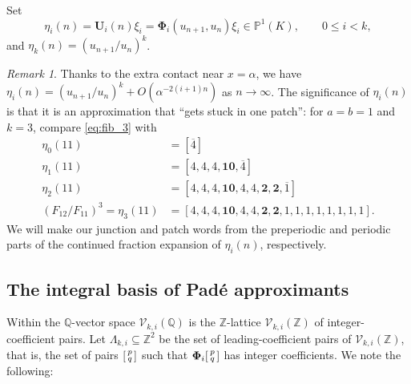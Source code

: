\documentclass{article}
\numberwithin{equation}{section}
\theoremstyle{definition}
\theoremstyle{remark}
\newtheorem{rem}[thm]{Remark}
\newcommand{\QQ}{\mathbb{Q}}
\newcommand{\PP}{\mathbb{P}}
\newcommand{\ZZ}{\mathbb{Z}}
\newcommand{\V}{\mathcal{V}}
\renewcommand{\to}{\mathop{\rightarrow}\limits}
\newcommand{\<}{\left\langle}
\renewcommand{\>}{\right\rangle}
\begin{document}
Set
\begin{equation*}
  \eta_i(n) = \mathbf{U}_i(n) \xi_i = \boldsymbol{\Phi}_i(u_{n+1}, u_n) \xi_i \in \PP^1(K), \qquad 0 \leq i < k,
\end{equation*}
and $\eta_k(n) = (u_{n+1}/u_n)^k$.
\begin{rem}
  Thanks to the extra contact near $x = \alpha$, we have $\eta_i(n) = (u_{n+1}/u_n)^k + O(\alpha^{-2(i+1)n})$ as $n \to \infty$. The significance of $\eta_i(n)$ is that it is an approximation that ``gets stuck in one patch'': for $a = b = 1$ and $k = 3$, compare \eqref{eq:fib_3} with
  \begin{equation}
    \begin{aligned}
      \eta_0(11) &= [\overline{4}] \\
      \eta_1(11) &= [4,4,4,\mathbf{10},\overline{4}] \\
      \eta_2(11) &= [4,4,4,\mathbf{10},4,4,\mathbf{2},\mathbf{2}, \overline{1}] \\
      (F_{12}/F_{11})^3 = \eta_3(11) &= [4,4,4,\mathbf{10},4,4,\mathbf{2},\mathbf{2},1,1,1,1,1,1,1,1].
    \end{aligned}
  \end{equation}
  We will make our junction and patch words from the preperiodic and periodic parts of the continued fraction expansion of $\eta_i(n)$, respectively.
\end{rem}


\subsection{The integral basis of Pad\'e approximants} \label{sec:int_basis}
Within the $\QQ$-vector space $\V_{k,i}(\QQ)$ is the $\ZZ$-lattice $\V_{k,i}(\ZZ)$ of integer-coefficient pairs. Let $\Lambda_{k,i} \subseteq \ZZ^2$ be the set of leading-coefficient pairs of $\V_{k,i}(\ZZ)$, that is, the set of pairs $\begin{bsmallmatrix}
  p \\ q
\end{bsmallmatrix}$ such that $\boldsymbol{\Phi}_i \begin{bsmallmatrix}
  p \\ q
\end{bsmallmatrix}$ has integer coefficients. We note the following:
\end{document}
